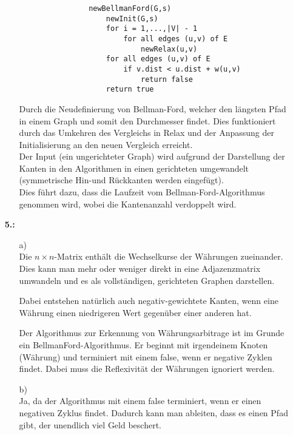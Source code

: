 \documentclass[a4paper,11pt,fleqn]{scrartcl}
\begin{document}
\begin{enumerate}
\begin{enumerate}
\begin{verbatim}
				newBellmanFord(G,s)
				    newInit(G,s)
				    for i = 1,...,|V| - 1
				        for all edges (u,v) of E
				            newRelax(u,v)
				    for all edges (u,v) of E
				        if v.dist < u.dist + w(u,v)
				            return false
				    return true
				\end{verbatim}
				Durch die Neudefinierung von Bellman-Ford, welcher den längsten Pfad in einem Graph und somit 
				den Durchmesser findet. Dies funktioniert durch das Umkehren des Vergleichs in Relax und der 
				Anpassung der Initialisierung an den neuen Vergleich erreicht. \\
				Der Input (ein ungerichteter Graph) wird aufgrund der Darstellung der Kanten in den Algorithmen
				in einen gerichteten umgewandelt (symmetrische Hin-und Rückkanten werden eingefügt). \\
				Dies führt dazu, dass die Laufzeit vom Bellman-Ford-Algorithmus genommen wird, wobei die 
				Kantenanzahl verdoppelt wird.
		\end{enumerate}
		\item[\textbf{5.:}]
		\begin{enumerate}
			\item[a)] \quad \\
			    Die $n \times n$-Matrix enthält die Wechselkurse der Währungen zueinander. Dies kann man mehr oder weniger direkt in eine Adjazenzmatrix umwandeln und es als vollständigen, gerichteten Graphen darstellen.
			    
			    Dabei entstehen natürlich auch negativ-gewichtete Kanten, wenn eine Währung einen niedrigeren Wert gegenüber einer anderen hat.
			    
			    Der Algorithmus zur Erkennung von Währungsarbitrage ist im Grunde ein BellmanFord-Algorithmus. Er beginnt mit irgendeinem Knoten (Währung) und terminiert mit einem false, wenn er negative Zyklen findet. Dabei muss die Reflexivität der Währungen ignoriert werden.
			\item[b)] \quad \\
				Ja, da der Algorithmus mit einem false terminiert, wenn er einen negativen Zyklus findet. Dadurch kann man ableiten, dass es einen Pfad gibt, der unendlich viel Geld beschert.
				

\end{enumerate}
\end{enumerate}
\end{document}
